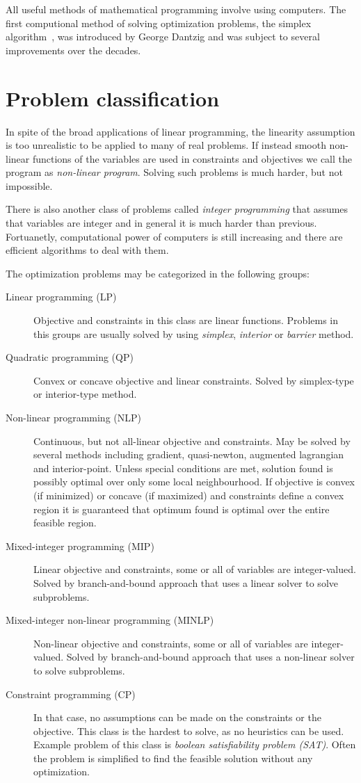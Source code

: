 All useful methods of mathematical programming involve using computers. The first computional method of solving optimization problems, the simplex algorithm~\cite{dantzig}, was introduced by George Dantzig and was subject to several improvements over the decades.

\section{Problem classification}
\label{sec:ampl:classification}

In spite of the broad applications of linear programming, the linearity assumption is too unrealistic to be applied to many of real problems. If instead smooth non-linear functions of the variables are used in constraints and objectives we call the program as \emph{non-linear program}. Solving such problems is much harder, but not impossible.

There is also another class of problems called \emph{integer programming} that assumes that variables are integer and in general it is much harder than previous. Fortuanetly, computational power of computers is still increasing and there are efficient algorithms to deal with them.

The optimization problems may be categorized in the following groups:
\begin{description}
  \item[Linear programming (LP)] Objective and constraints in this class are linear functions. Problems in this groups are usually solved by using \emph{simplex}, \emph{interior} or \emph{barrier} method.
  \item[Quadratic programming (QP)] Convex or concave objective and linear constraints. Solved by simplex-type or interior-type method.
  \item[Non-linear programming (NLP)] Continuous, but not all-linear objective and constraints. May be solved by several methods including gradient, quasi-newton, augmented lagrangian and interior-point. Unless special conditions are met, solution found is possibly optimal over only some local neighbourhood. If objective is convex (if minimized) or concave (if maximized) and constraints define a convex region it is guaranteed that optimum found is optimal over the entire feasible region.
  \item[Mixed-integer programming (MIP)] Linear objective and constraints, some or all of variables are integer-valued. Solved by branch-and-bound approach that uses a linear solver to solve subproblems.
  \item[Mixed-integer non-linear programming (MINLP)] Non-linear objective and constraints, some or all of variables are integer-valued. Solved by branch-and-bound approach that uses a non-linear solver to solve subproblems.
  \item[Constraint programming (CP)] In that case, no assumptions can be made on the constraints or the objective. This class is the hardest to solve, as no heuristics can be used. Example problem of this class is \emph{boolean satisfiability problem (SAT)}. Often the problem is simplified to find the feasible solution without any optimization.
\end{description}

